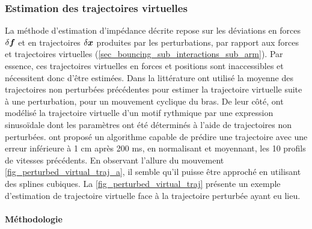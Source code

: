 \documentclass[12pt, a4paper]{article} %
\numberwithin{equation}{section}
\begin{document}
\subsubsection{Estimation des trajectoires virtuelles} \label{sec_impedance_estimation_sub_tools_sub_virtual_trajectory}

La méthode d'estimation d'impédance décrite repose sur les déviations en forces $ \delta \vect{f} $ et en trajectoires $ \delta \vect{x} $ produites par les perturbations, par rapport aux forces et trajectoires virtuelles (\cref{sec_bouncing_sub_interactions_sub_arm}). Par essence, ces trajectoires virtuelles en forces et positions sont inaccessibles et nécessitent donc d'être estimées. 
%
\newlineBlank
%
Dans la littérature \cite{bennett_time-varying_1992} ont utilisé la moyenne des trajectoires non perturbées précédentes pour estimer la trajectoire virtuelle suite à une perturbation, pour un mouvement cyclique du bras. De leur côté, \cite{abe_modulation_2003} ont modélisé la trajectoire virtuelle d'un motif rythmique par une expression sinusoïdale dont les paramètres ont été déterminés à l'aide de trajectoires non perturbées. \cite{burdet_method_2000} ont proposé un algorithme capable de prédire une trajectoire avec une erreur inférieure à 1 cm après 200 ms, en normalisant et moyennant, les 10 profils de vitesses précédents.
%
\newlineBlank
%
En observant l'allure du mouvement \cref{fig_perturbed_virtual_traj_a}, il semble qu'il puisse être approché en utilisant des splines cubiques. La \cref{fig_perturbed_virtual_traj} présente un exemple d'estimation de trajectoire virtuelle face à la trajectoire perturbée ayant eu lieu.
%


\paragraph{Méthodologie}
\end{document}
